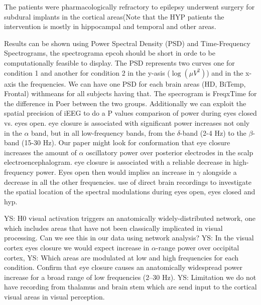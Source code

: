 \documentclass[11pt, onecolumn]{article}
\begin{document}
The patients were pharmacologically refractory to epilepsy underwent surgery for subdural implants in the cortical areas(Note that the HYP patients the intervention is mostly in hippocampal and temporal and other areas.

Results can be shown using Power Spectral Density (PSD) and Time-Frequency Spectrograms, the spectrograma epcoh should be short in orde to be computationally feasible to display. The PSD represents two curves one for condition 1 and another for condition 2 in the y-asis ($\log(\mu V^2) $) and in the x-axis the frequencies. We can have one PSD for each brain areas (HD, BiTemp, Frontal) withmeans for all subjects having that. The specrogram is FreqxTime for the difference in Poer between the two groups.
Additionally we can exploit the spatial precision of iEEG to do a P values comparison of power during eyes closed vs. eyes open.
eye closure is associated with significant power increases not only in the $\alpha$ band, but in all low-frequency bands, from the $\delta$-band (2-4 Hz) to the $\beta$-band (15-30 Hz).
Our paper might look for conformation that eye closure increases the amount of $\alpha$ oscillatory power over posterior electrodes in the scalp electroencephalogram. eye closure is associated with a reliable decrease in high-frequency power. Eyes open then would implies an increase in $\gamma$ alongside a decrease in all the other frequencies.
use of direct brain recordings to investigate the spatial location of the spectral modulations during eyes open, eyes closed and hyp.

YS: H0  visual activation triggers an anatomically widely-distributed network, one which includes areas that have not been classically implicated in visual processing. Can we see this in our data using network analysis?
YS: In the visual cortex eyes closure we would expect increase in $\alpha$-range power over occipital cortex, 
YS: Which areas are modulated at low and high frequencies for each condition. Confirm that eye closure causes an anatomically widespread power increase for a broad range of low frequencies (2–30 Hz).
YS: Limitation we do not have recording from thalamus and brain stem which are send input to the cortical visual areas in visual perception.
\end{document}

